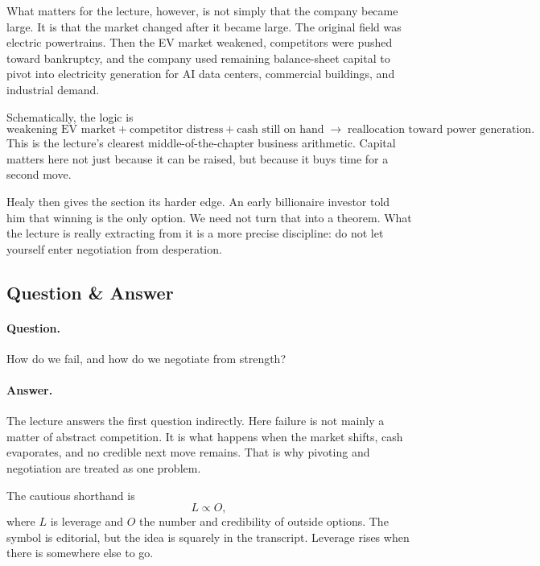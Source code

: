 What matters for the lecture, however, is not simply that the company became large. It is that the market changed after it became large. The original field was electric powertrains. Then the EV market weakened, competitors were pushed toward bankruptcy, and the company used remaining balance-sheet capital to pivot into electricity generation for AI data centers, commercial buildings, and industrial demand.

Schematically, the logic is
\begin{equation}
\text{weakening EV market}+\text{competitor distress}+\text{cash still on hand}
\;\longrightarrow\;
\text{reallocation toward power generation}.
\end{equation}
This is the lecture's clearest middle-of-the-chapter business arithmetic. Capital matters here not just because it can be raised, but because it buys time for a second move.

Healy then gives the section its harder edge. An early billionaire investor told him that winning is the only option. We need not turn that into a theorem. What the lecture is really extracting from it is a more precise discipline: do not let yourself enter negotiation from desperation.

\subsection{Question \& Answer}

\paragraph{Question.} How do we fail, and how do we negotiate from strength?

\paragraph{Answer.} The lecture answers the first question indirectly. Here failure is not mainly a matter of abstract competition. It is what happens when the market shifts, cash evaporates, and no credible next move remains. That is why pivoting and negotiation are treated as one problem.

The cautious shorthand is
\begin{equation}
L \propto O,
\end{equation}
where \(L\) is leverage and \(O\) the number and credibility of outside options. The symbol is editorial, but the idea is squarely in the transcript. Leverage rises when there is somewhere else to go.

